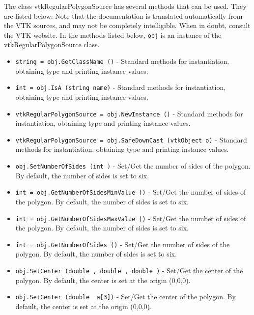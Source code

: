 The class vtkRegularPolygonSource has several methods that can be used.
  They are listed below.
Note that the documentation is translated automatically from the VTK sources,
and may not be completely intelligible.  When in doubt, consult the VTK website.
In the methods listed below, \verb|obj| is an instance of the vtkRegularPolygonSource class.
\begin{itemize}
\item  \verb|string = obj.GetClassName ()| -  Standard methods for instantiation, obtaining type and printing instance values.

\item  \verb|int = obj.IsA (string name)| -  Standard methods for instantiation, obtaining type and printing instance values.

\item  \verb|vtkRegularPolygonSource = obj.NewInstance ()| -  Standard methods for instantiation, obtaining type and printing instance values.

\item  \verb|vtkRegularPolygonSource = obj.SafeDownCast (vtkObject o)| -  Standard methods for instantiation, obtaining type and printing instance values.

\item  \verb|obj.SetNumberOfSides (int )| -  Set/Get the number of sides of the polygon. By default, the number of sides
 is set to six.

\item  \verb|int = obj.GetNumberOfSidesMinValue ()| -  Set/Get the number of sides of the polygon. By default, the number of sides
 is set to six.

\item  \verb|int = obj.GetNumberOfSidesMaxValue ()| -  Set/Get the number of sides of the polygon. By default, the number of sides
 is set to six.

\item  \verb|int = obj.GetNumberOfSides ()| -  Set/Get the number of sides of the polygon. By default, the number of sides
 is set to six.

\item  \verb|obj.SetCenter (double , double , double )| -  Set/Get the center of the polygon. By default, the center is set at the
 origin (0,0,0).

\item  \verb|obj.SetCenter (double  a[3])| -  Set/Get the center of the polygon. By default, the center is set at the
 origin (0,0,0).


\end{itemize}
